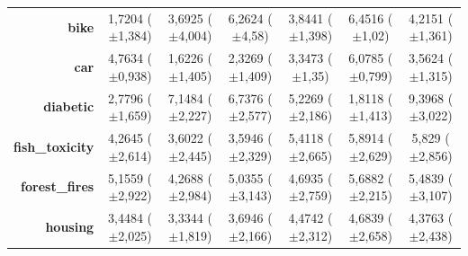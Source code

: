 \documentclass[preprint,review,12pt]{elsarticle}
\begin{document}
\begin{table}[htb]
{\begin{tabular}{r|ccc|c|c|c|}
			\textbf{bike}                 & \cellcolor[rgb]{ .388,  .745,  .482}1,7204 ($\pm$1,384)                            & \cellcolor[rgb]{ .643,  .816,  .494}3,6925 ($\pm$4,004) & \cellcolor[rgb]{ .973,  .914,  .514}6,2624 ($\pm$4,58)  & \cellcolor[rgb]{ .663,  .824,  .498}3,8441 ($\pm$1,398) & \cellcolor[rgb]{ 1,  .922,  .518}6,4516 ($\pm$1,02)     & \cellcolor[rgb]{ .71,  .835,  .498}4,2151 ($\pm$1,361)  \\
			\textbf{car}                  & \cellcolor[rgb]{ .702,  .835,  .498}4,7634 ($\pm$0,938)                            & \cellcolor[rgb]{ .388,  .745,  .482}1,6226 ($\pm$1,405) & \cellcolor[rgb]{ .455,  .765,  .486}2,3269 ($\pm$1,409) & \cellcolor[rgb]{ .561,  .792,  .49}3,3473 ($\pm$1,35)   & \cellcolor[rgb]{ .831,  .871,  .506}6,0785 ($\pm$0,799) & \cellcolor[rgb]{ .58,  .8,  .49}3,5624 ($\pm$1,315)     \\
			\textbf{diabetic}             & \cellcolor[rgb]{ .506,  .776,  .486}2,7796 ($\pm$1,659)                            & \cellcolor[rgb]{ 1,  .886,  .514}7,1484 ($\pm$2,227)    & \cellcolor[rgb]{ 1,  .922,  .518}6,7376 ($\pm$2,577)    & \cellcolor[rgb]{ .812,  .867,  .506}5,2269 ($\pm$2,186) & \cellcolor[rgb]{ .388,  .745,  .482}1,8118 ($\pm$1,413) & \cellcolor[rgb]{ .988,  .69,  .475}9,3968 ($\pm$3,022)  \\
			\textbf{fish\_toxicity}       & \cellcolor[rgb]{ .533,  .784,  .49}4,2645 ($\pm$2,614)                             & \cellcolor[rgb]{ .388,  .745,  .482}3,6022 ($\pm$2,445) & \cellcolor[rgb]{ .388,  .745,  .482}3,5946 ($\pm$2,329) & \cellcolor[rgb]{ .784,  .859,  .502}5,4118 ($\pm$2,665) & \cellcolor[rgb]{ .89,  .89,  .51}5,8914 ($\pm$2,629)    & \cellcolor[rgb]{ .875,  .886,  .51}5,829 ($\pm$2,856)   \\
			\textbf{forest\_fires}        & \cellcolor[rgb]{ .769,  .855,  .502}5,1559 ($\pm$2,922)                            & \cellcolor[rgb]{ .388,  .745,  .482}4,2688 ($\pm$2,984) & \cellcolor[rgb]{ .718,  .839,  .498}5,0355 ($\pm$3,143) & \cellcolor[rgb]{ .569,  .796,  .49}4,6935 ($\pm$2,759)  & \cellcolor[rgb]{ 1,  .922,  .518}5,6882 ($\pm$2,215)    & \cellcolor[rgb]{ .91,  .894,  .51}5,4839 ($\pm$3,107)   \\
			\textbf{housing}              & \cellcolor[rgb]{ .404,  .749,  .482}3,4484 ($\pm$2,025)                            & \cellcolor[rgb]{ .388,  .745,  .482}3,3344 ($\pm$1,819) & \cellcolor[rgb]{ .439,  .757,  .482}3,6946 ($\pm$2,166) & \cellcolor[rgb]{ .553,  .792,  .49}4,4742 ($\pm$2,312)  & \cellcolor[rgb]{ .584,  .8,  .49}4,6839 ($\pm$2,658)    & \cellcolor[rgb]{ .537,  .788,  .49}4,3763 ($\pm$2,438)  \\

\end{tabular}}
\end{table}
\end{document}
